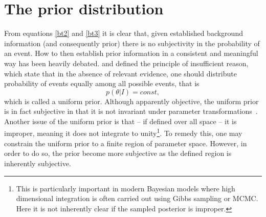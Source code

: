 \chapter{The prior distribution}
From equations \eqref{bt2} and \eqref{bt3} it is clear that, given established background information (and consequently prior) there is no subjectivity in the probability of an event. How to then establish prior information in a consistent and meaningful way has been heavily debated. \citet{Bernoulli1713} and \citet{laplace_thorie_1812} defined the principle of insufficient reason, which state that in the absence of relevant evidence, one should distribute probability of events equally among all possible events, that is
\begin{equation}
	p(\theta|I)=const,
\end{equation}
which is called a uniform prior. Although apparently objective, the uniform prior is in fact subjective in that it is not invariant under parameter transformations~\citep{Kass1996}. Another issue of the uniform prior is that -- if defined over all space -- it is improper, meaning it does not integrate to unity\footnote{This is particularly important in modern Bayesian models where high dimensional integration is often carried out using Gibbs sampling or MCMC. Here it is not inherently clear if the sampled posterior is improper.}. To remedy this, one may constrain the uniform prior to a finite region of parameter space. However, in order to do so, the prior become more subjective as the defined region is inherently subjective. 



